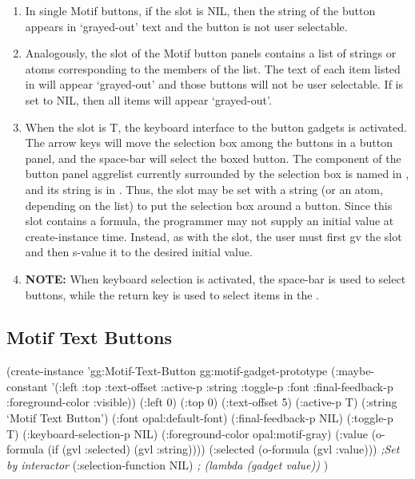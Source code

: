 \begin{enumerate}
\item In single Motif buttons, if the  slot is NIL, then the string of
the button appears in `grayed-out' text and the button is not user selectable.

\item Analogously, the  slot of the Motif button panels contains
a list of strings or atoms corresponding to the members of the 
list.  The text of each item listed in  will appear
`grayed-out' and those buttons will not be user selectable.  If 
is set to NIL, then all items will appear `grayed-out'.

\item {}
When the slot  is T, the keyboard interface to the
button gadgets is activated.  The arrow keys will move the selection box among
the buttons in a button panel, and the space-bar will select the boxed
button.  The component of the button panel aggrelist currently surrounded by
the selection box is named in
, and its string is in .
Thus, the slot  may be set with a string (or an atom,
depending on the  list) to put the selection box around a button.
Since this slot contains a formula, the programmer may not supply an initial
value at create-instance time.  Instead, as with the  slot, the user
must first gv the  slot and then s-value it to
the desired initial value.

\item {\bf NOTE:} When keyboard selection is activated, the space-bar is used to
select buttons, while the return key is used to select items in the
.
\end{enumerate}

\begin{group}
\subsection{Motif Text Buttons}
\label{motif-text-buttons}

\begin{programexample}
(create-instance 'gg:Motif-Text-Button gg:motif-gadget-prototype
   (:maybe-constant '(:left :top :text-offset :active-p :string :toggle-p :font
                      :final-feedback-p :foreground-color :visible))
   (:left 0)
   (:top 0)
   (:text-offset 5)
   (:active-p T)
   (:string `Motif Text Button')
   (:font opal:default-font)
   (:final-feedback-p NIL)
   (:toggle-p T)
   (:keyboard-selection-p NIL)
   (:foreground-color opal:motif-gray)
   (:value (o-formula (if (gvl :selected) (gvl :string))))
   (:selected (o-formula (gvl :value)))  {\it ;Set by interactor}
   (:selection-function NIL)   {\it ; (lambda (gadget value))}
   )
\end{programexample}
\end{group}
\vspace{1 line}

